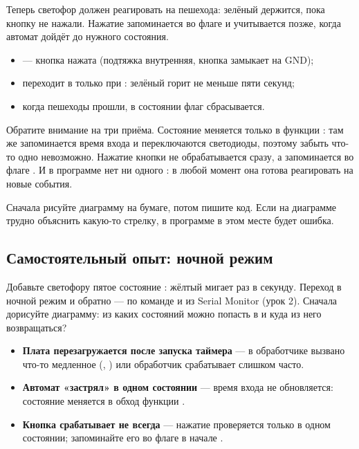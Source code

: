 Теперь светофор должен реагировать на пешехода: зелёный держится, пока кнопку не нажали. Нажатие
запоминается во флаге  и учитывается позже, когда автомат дойдёт до нужного состояния.


\begin{itemize}[leftmargin=*]
  \item {} --- кнопка нажата (подтяжка внутренняя, кнопка замыкает на GND);
  \item {} переходит в  только при : зелёный горит не меньше пяти секунд;
  \item когда пешеходы прошли, в состоянии  флаг  сбрасывается.
\end{itemize}

Обратите внимание на три приёма. Состояние меняется только в функции : там же
запоминается время входа и переключаются светодиоды, поэтому забыть что-то одно невозможно. Нажатие
кнопки не обрабатывается сразу, а запоминается во флаге . И в программе нет ни одного
: в любой момент она готова реагировать на новые события.

\begin{tip}
Сначала рисуйте диаграмму на бумаге, потом пишите код. Если на диаграмме трудно объяснить какую-то
стрелку, в программе в этом месте будет ошибка.
\end{tip}

\subsection{Самостоятельный опыт: ночной режим}

Добавьте светофору пятое состояние : жёлтый мигает раз в секунду. Переход в ночной режим
и обратно --- по команде  и  из Serial Monitor (урок 2). Сначала дорисуйте
диаграмму: из каких состояний можно попасть в  и куда из него возвращаться?

\begin{trouble}
\begin{itemize}[leftmargin=*]
  \item \textbf{Плата перезагружается после запуска таймера} --- в обработчике вызвано что-то медленное
        (, ) или обработчик срабатывает слишком часто.
  \item \textbf{Автомат «застрял» в одном состоянии} --- время входа не обновляется: состояние меняется
        в обход функции .
  \item \textbf{Кнопка срабатывает не всегда} --- нажатие проверяется только в одном состоянии; запоминайте
        его во флаге в начале .
\end{itemize}
\end{trouble}

